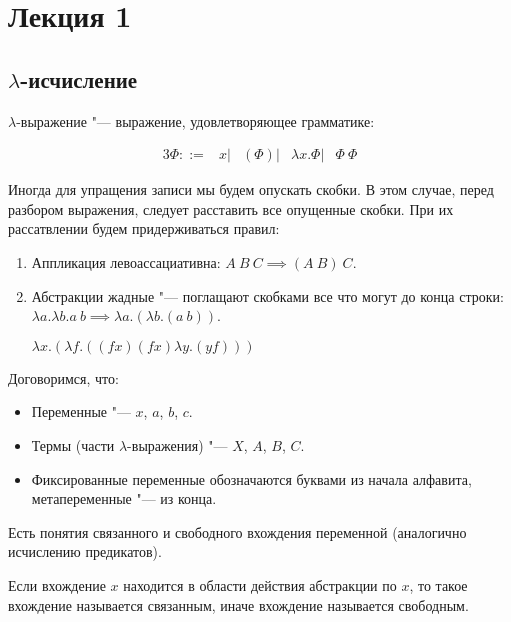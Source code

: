 \section{Лекция 1}

\subsection{$\lambda$-исчисление}

\begin{definition}
	$\lambda$-выражение "--- выражение, удовлетворяющее грамматике:
	\begin{bnf}
	\begin{alignat*}{3}
		\Phi ::= & x
		       | & \left(\Phi\right) 
		       | & \lambda{}x.\Phi 
		       | & \Phi \ \Phi        
	\end{alignat*}
	\end{bnf}
\end{definition}

Иногда для упращения записи мы будем опускать скобки. В этом случае, перед разбором выражения, следует расставить все опущенные скобки. При их рассатвлении будем придерживаться правил:
\begin{enumerate}
	\item Аппликация левоассациативна: $A \ B \ C \implies (A \ B) \ C$.
	\item Абстракции жадные "--- поглащают скобками все что могут до конца строки: 
	$\lambda{}a.\lambda{}b.a \ b \implies \lambda{}a.(\lambda{}b.(a \ b))$.
	\vspace{1mm}
	\begin{example}
		$\lambda{}x.(\lambda{}f.((f x) (f x) \lambda{}y.(y f)))$
	\end{example}
\end{enumerate}

Договоримся, что:
\begin{itemize}
	\item Переменные "--- $x$, $a$, $b$, $c$.
	\item Термы (части $\lambda$-выражения) "--- $X$, $A$, $B$, $C$.
	\item Фиксированные переменные обозначаются буквами из начала алфавита, метапеременные "--- из конца.
\end{itemize}

Есть понятия связанного и свободного вхождения переменной (аналогично исчислению предикатов).

\begin{definition}
	Если вхождение $x$ находится в области действия абстракции по $x$, то такое вхождение называется связанным, иначе вхождение называется свободным.
\end{definition}

